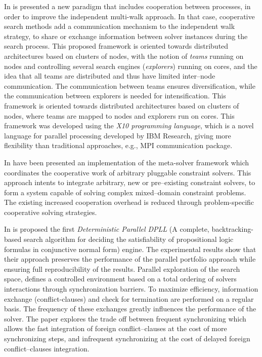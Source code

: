 In \cite{Munera} is presented a new paradigm that includes cooperation between processes, in order to improve the independent multi-walk approach. In that case, cooperative search methods add a communication mechanism to the independent walk strategy, to share or exchange information between solver instances during the search process. This proposed framework is oriented towards distributed architectures based on clusters of nodes, with the notion of {\it teams} running on nodes and controlling several search engines ({\it explorers}) running on cores, and the idea that all teams are distributed and thus have limited inter--node communication. The communication between teams ensures diversification, while the communication between explorers is needed for intensification. This framework is oriented towards distributed architectures based on clusters of nodes, where teams are mapped to nodes and explorers run on cores. This framework was developed using the {\it X10 programming language}, which is a novel language for parallel processing developed by IBM Research, giving more flexibility than traditional approaches, e.g., MPI communication package.

In \cite{Frank2003} have been presented an implementation of the meta-solver framework which coordinates the cooperative work of arbitrary pluggable constraint solvers. This approach intents to integrate arbitrary, new or pre--existing constraint solvers, to form a system capable of solving complex mixed--domain constraint problems. The existing increased cooperation overhead is reduced through problem-specific cooperative solving strategies.

In \cite{Hamadi2011} is proposed the first {\it Deterministic Parallel DPLL} (A complete,  backtracking-based search algorithm for deciding the satisfiability of propositional logic formulas in conjunctive normal form) engine. The experimental results show that their approach preserves the performance of the parallel portfolio approach while ensuring full reproducibility of the results. Parallel exploration of the search space, defines a controlled environment based on a total ordering of solvers interactions through synchronization barriers. To maximize efficiency, information exchange (conflict-clauses) and check for termination are performed on a regular basis. The frequency of these exchanges greatly influences the performance of the solver. The paper explores the trade off between frequent synchronizing which allows the fast integration of foreign conflict--clauses at the cost of more synchronizing steps, and infrequent synchronizing at the cost of delayed foreign conflict--clauses integration.

